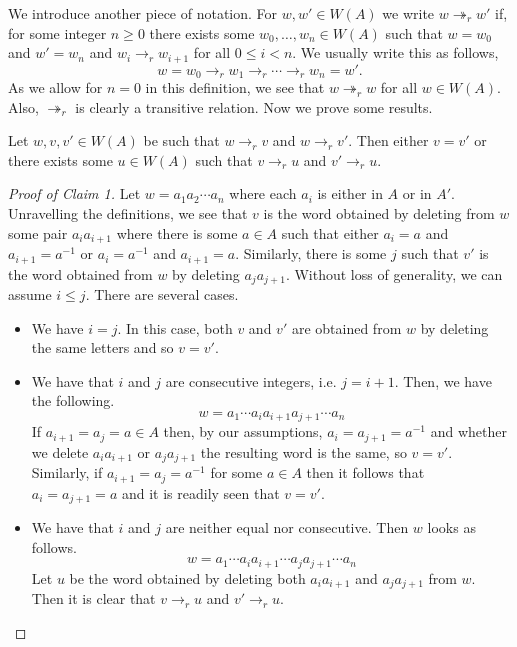 \begin{solution}
	We introduce another piece of notation. For $w,w'\in W(A)$ we write $w\twoheadrightarrow_r w'$ if, for some integer $n\geq 0$ there exists some $w_0,\ldots, w_n\in W(A)$ such that $w = w_0$ and $w'= w_n$ and $w_i \to_r w_{i+1}$ for all $0\leq i < n$. We usually write this as follows,
	\[
		w = w_0 \to_r w_1 \to_r \cdots \to_r w_n = w'.
	\]
	As we allow for $n = 0$ in this definition, we see that $w\twoheadrightarrow_r w$ for all $w\in W(A)$. Also, $\twoheadrightarrow_r$ is clearly a transitive relation. Now we prove some results.
	\begin{claim}
		Let $w,v,v'\in W(A)$ be such that $w\to_r v$ and $w\to_r v'$. Then either $v=v'$ or there exists some $u\in W(A)$ such that $v\to_r u$ and $v' \to_r u$. 
	\end{claim}
	\begin{proof}[Proof of Claim 1]
		Let $w = a_1a_2\cdots a_n$ where each $a_i$ is either in $A$ or in $A'$. Unravelling the definitions, we see that $v$ is the word obtained by deleting from $w$ some pair $a_ia_{i+1}$ where there is some $a\in A$ such that either $a_i = a$ and $a_{i+1} = a^{-1}$ or $a_i = a^{-1}$ and $a_{i+1} = a$. Similarly, there is some $j$ such that $v'$ is the word obtained from $w$ by deleting $a_ja_{j+1}$. Without loss of generality, we can assume $i\leq j$. There are several cases.
		\begin{itemize}[wide, labelwidth=!]
			\item We have $i = j$. In this case, both $v$ and $v'$ are obtained from $w$ by deleting the same letters and so $v = v'$.
			\item We have that $i$ and $j$ are consecutive integers, i.e. $j = i + 1$. Then, we have the following.
			\[
				w = a_1\cdots a_ia_{i+1}a_{j+1}\cdots a_n
			\]
			If $a_{i+1} =a_j = a\in A$ then, by our assumptions, $a_i = a_{j+1} = a^{-1}$ and whether we delete $a_ia_{i+1}$ or $a_ja_{j+1}$ the resulting word is the same, so $v=v'$. Similarly, if $a_{i+1} = a_j = a^{-1}$ for some $a\in A$ then it follows that $a_i=a_{j+1} = a$ and it is readily seen that $v = v'$.
			\item We have that $i$ and $j$ are neither equal nor consecutive. Then $w$ looks as follows.
			\[
				w = a_1\cdots a_ia_{i+1} \cdots a_{j}a_{j+1} \cdots a_n
			\]
			Let $u$ be the word obtained by deleting both $a_ia_{i+1}$ and $a_{j}a_{j+1}$ from $w$. Then it is clear that $v\to_r u$ and $v'\to_r u$.\qedhere  
		\end{itemize}
	\end{proof}
	\begin{claim}

\end{claim}
\end{solution}
